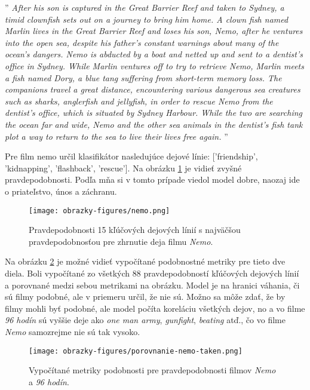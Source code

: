 \noindent''\textit{
After his son is captured in the Great Barrier Reef and taken to Sydney, a timid clownfish sets out on a journey to bring him home. A clown fish named Marlin lives in the Great Barrier Reef and loses his son, Nemo, after he ventures into the open sea, despite his father's constant warnings about many of the ocean's dangers. Nemo is abducted by a boat and netted up and sent to a dentist's office in Sydney. While Marlin ventures off to try to retrieve Nemo, Marlin meets a fish named Dory, a blue tang suffering from short-term memory loss. The companions travel a great distance, encountering various dangerous sea creatures such as sharks, anglerfish and jellyfish, in order to rescue Nemo from the dentist's office, which is situated by Sydney Harbour. While the two are searching the ocean far and wide, Nemo and the other sea animals in the dentist's fish tank plot a way to return to the sea to live their lives free again.
}''

Pre film nemo určil klasifikátor nasledujúce dejové línie: ['friendship', 'kidnapping', 'flashback', 'rescue']. Na obrázku \ref{nemo} je vidieť zvyšné pravdepodobnosti. Podľa mňa si v tomto prípade viedol model dobre, naozaj ide o priateľstvo, únos a záchranu. 

\begin{figure}[ht!]
	\centering
	\texttt{[image: obrazky-figures/nemo.png]}
	\caption{Pravdepodobnosti 15 kľúčových dejových línií s najväčšou pravdepodobnosťou pre zhrnutie deja filmu \textit{Nemo}.}
	\label{nemo}
\end{figure}

Na obrázku \ref{porovnanie-nemo-taken} je možné vidieť vypočítané podobnostné metriky pre tieto dve diela. Boli vypočítané zo všetkých 88 pravdepodobností kľúčových dejových línií a porovnané medzi sebou metrikami na obrázku. Model je na hranici váhania, či sú filmy podobné, ale v priemeru určil, že nie sú. Možno sa môže zdať, že by filmy mohli byť podobné, ale model počíta koreláciu všetkých dejov, no a vo filme \textit{96 hodín} sú vyššie deje ako \textit{one man army}, \textit{gunfight}, \textit{beating} atď., čo vo filme \textit{Nemo} samozrejme nie sú tak vysoko. 

\begin{figure}[ht!]
	\centering
	\texttt{[image: obrazky-figures/porovnanie-nemo-taken.png]}
	\caption{Vypočítané metriky podobnosti pre pravdepodobnosti filmov \textit{Nemo} a \textit{96 hodín}.}
	\label{porovnanie-nemo-taken}
\end{figure}

